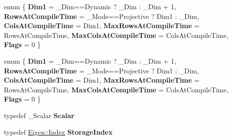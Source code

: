 \begin{DoxyCompactItemize}
\item 
\mbox{\label{struct_eigen_1_1internal_1_1traits_3_01_transform_3_01___scalar_00_01___dim_00_01___mode_00_01___options_01_4_01_4_a151cb4c0c820097cb35ffadc15f33590}} 
enum \{ \newline
{\bfseries Dim1} = \+\_\+\+Dim==Dynamic ? \+\_\+\+Dim \+: \+\_\+\+Dim + 1, 
{\bfseries Rows\+At\+Compile\+Time} = \+\_\+\+Mode==Projective ? Dim1 \+: \+\_\+\+Dim, 
{\bfseries Cols\+At\+Compile\+Time} = Dim1, 
{\bfseries Max\+Rows\+At\+Compile\+Time} = Rows\+At\+Compile\+Time, 
\newline
{\bfseries Max\+Cols\+At\+Compile\+Time} = Cols\+At\+Compile\+Time, 
{\bfseries Flags} = 0
 \}
\item 
\mbox{\label{struct_eigen_1_1internal_1_1traits_3_01_transform_3_01___scalar_00_01___dim_00_01___mode_00_01___options_01_4_01_4_af24f53ea5d666244ba5856d9f583876b}} 
enum \{ \newline
{\bfseries Dim1} = \+\_\+\+Dim==Dynamic ? \+\_\+\+Dim \+: \+\_\+\+Dim + 1, 
{\bfseries Rows\+At\+Compile\+Time} = \+\_\+\+Mode==Projective ? Dim1 \+: \+\_\+\+Dim, 
{\bfseries Cols\+At\+Compile\+Time} = Dim1, 
{\bfseries Max\+Rows\+At\+Compile\+Time} = Rows\+At\+Compile\+Time, 
\newline
{\bfseries Max\+Cols\+At\+Compile\+Time} = Cols\+At\+Compile\+Time, 
{\bfseries Flags} = 0
 \}
\item 
\mbox{\label{struct_eigen_1_1internal_1_1traits_3_01_transform_3_01___scalar_00_01___dim_00_01___mode_00_01___options_01_4_01_4_a752d8ba2ed25861d5053c89b7a61e754}} 
typedef \+\_\+\+Scalar {\bfseries Scalar}
\item 
\mbox{\label{struct_eigen_1_1internal_1_1traits_3_01_transform_3_01___scalar_00_01___dim_00_01___mode_00_01___options_01_4_01_4_a8aff88c71a2ca27edf22fa931c3740aa}} 
typedef \hyperlink{namespace_eigen_a62e77e0933482dafde8fe197d9a2cfde}{Eigen\+::\+Index} {\bfseries Storage\+Index}

\end{DoxyCompactItemize}
